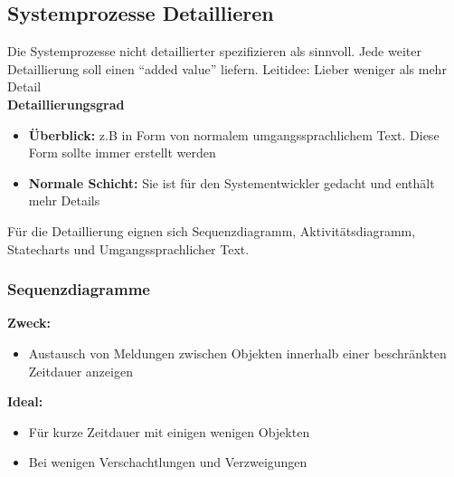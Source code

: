 \subsection{Systemprozesse Detaillieren }
Die Systemprozesse nicht detaillierter spezifizieren als sinnvoll. Jede weiter Detaillierung soll einen "`added value"' liefern. 
Leitidee: Lieber weniger als mehr Detail\\

\textbf{Detaillierungsgrad}
\begin{itemize}
	\item \textbf{Überblick: } z.B in Form von normalem umgangssprachlichem Text. Diese Form sollte immer erstellt werden
	\item \textbf{Normale Schicht: } Sie ist für den Systementwickler gedacht und enthält mehr Details  
\end{itemize}

Für die Detaillierung eignen sich Sequenzdiagramm, Aktivitätsdiagramm, Statecharts und Umgangssprachlicher Text.

\subsubsection{Sequenzdiagramme }

\begin{multicols}{2}
	\textbf{Zweck:}
	\begin{itemize}
		\item Austausch von Meldungen zwischen Objekten innerhalb einer beschränkten Zeitdauer anzeigen
	\end{itemize}
	\columnbreak
	
	\textbf{Ideal:}
	\begin{itemize}
		\item Für kurze Zeitdauer mit einigen wenigen Objekten
		\item Bei wenigen Verschachtlungen und Verzweigungen
	\end{itemize}
\end{multicols}

